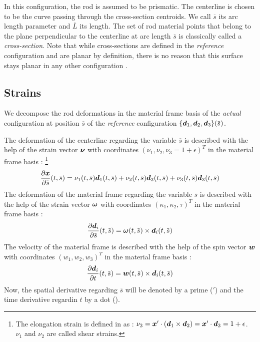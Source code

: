 In this configuration, the rod is assumed to be prismatic. The centerline is chosen to be the curve passing through the cross-section centroids. We call $\overbar{s}$ its arc length parameter and $\overbar{L}$ its length. The set of rod material points that belong to the plane perpendicular to the centerline at arc length $\overbar{s}$ is classically called a \emph{cross-section}. Note that while cross-sections are defined in the \emph{reference} configuration and are planar by definition, there is no reason that this surface stays planar in any other configuration \cite[p.~5]{Dill1992}.

\subsection{Strains}

We decompose the rod deformations in the material frame basis of the \emph{actual} configuration at position $\overbar{s}$ of the \emph{reference} configuration $\{\vect{d}_1, \vect{d}_2, \vect{d}_3\}(\overbar{s})$.

The deformation of the centerline regarding the variable $\overbar{s}$ is described with the help of the strain vector $\boldsymbol{\nu}$ with coordinates $(\nu_1, \nu_2, \nu_3 = 1 + \epsilon)^T$ in the material frame basis : \footnote{The elongation strain is defined in \cite[pp.~283]{Antman2005} as : $\nu_3 = \boldsymbol{x}' \cdot (\boldsymbol{d}_1 \times \boldsymbol{d}_2) =  \boldsymbol{x}' \cdot \boldsymbol{d}_3 = 1+\epsilon$. $\nu_1$ and $\nu_2$ are called shear strains.}
\begin{equation}
		\frac{\partial \vect{x}}{\partial \overbar{s}} (t, \overbar{s})  = {\nu_1}(t, \overbar{s}) \vect{d}_1(t, \overbar{s})
		+ {\nu_2}(t, \overbar{s}) \vect{d}_2(t, \overbar{s})
		+ {\nu_3}(t, \overbar{s}) \vect{d}_3(t, \overbar{s})
\end{equation}
The deformation of the material frame regarding the variable $\overbar{s}$ is described with the help of the strain vector $\boldsymbol{\omega}$ with coordinates $(\kappa_1, \kappa_2, \tau)^T$ in the material frame basis :
\begin{equation}	
		\frac{\partial \vect{d}_i}{\partial \overbar{s}} (t, \overbar{s}) = \vect{\omega}(t, \overbar{s}) \times  \vect{d}_i (t, \overbar{s})
\end{equation}
The velocity of the material frame is described with the help of the spin vector $\boldsymbol{w}$ with coordinates $(w_1, w_2, w_3)^T$ in the material frame basis :
\begin{equation}	
		\frac{\partial \vect{d}_i}{\partial t} (t, \overbar{s}) = \vect{w}(t, \overbar{s}) \times  \vect{d}_i (t, \overbar{s})
\end{equation}
Now, the spatial derivative regarding $\overbar{s}$ will be denoted by a prime (${}'$) and the time derivative regardin $t$ by a dot ($\dot{}$).


